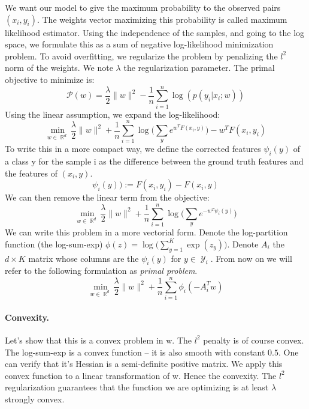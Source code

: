 \documentclass{article}
\DeclareMathOperator{\R}{\mathbb{R}}
\DeclareMathOperator{\1}{\mathbb{1}}
\DeclareMathOperator{\Y}{\mathcal{Y}}
\begin{document}
We want our model to give the maximum probability to the observed pairs $(x_i, y_i)$.
The weights vector maximizing this probability is called maximum likelihood estimator.
Using the independence of the samples, and going to the log space, we formulate this as a sum of negative log-likelihood minimization problem.
To avoid overfitting, we regularize the problem by penalizing the $l^2$ norm of the weights.
We note $\lambda$ the regularization parameter. The primal objective to minimize is:
\begin{equation*}
\mathscr P(w) = \frac{\lambda}{2}\|w\|^2 - \frac{1}{n}   \sum_{i=1}^{n} \log(p(y_i|x_i; w))	
\end{equation*}
Using the linear assumption, we expand the log-likelihood:
\begin{equation*}
	\min_{w\in\R^d} \frac{\lambda}{2}\|w\|^2 + \frac{1}{n}   \sum_{i=1}^{n}  \log \big (\sum_y e^{w^TF(x_i, y)} \big ) - w^TF(x_i, y_i)	
\end{equation*}
To write this in a more compact way, we define the corrected features $\psi_i(y)$ of a class y for the sample i as the difference between the ground truth features and the features of $(x_i, y)$.
\begin{equation*}
	\psi_i(y)) := F(x_i, y_i) - F(x_i, y)
\end{equation*}
We can then remove the linear term from the objective:
\begin{equation*}
	\min_{w\in\R^d} \frac{\lambda}{2}\|w\|^2 + \frac{1}{n}   \sum_{i=1}^{n}  \log \big (\sum_y e^{- w^T\psi_i(y)} \big )
\end{equation*}
We can write this problem in a more vectorial form.
Denote the log-partition function (the log-sum-exp) $\phi(z) = \log \big(\sum_{y=1}^K \exp(z_y)\big)$. 
Denote $A_i$ the $d \times K$ matrix whose columns are the $\psi_i(y)$ for $y \in \Y_i$.
From now on we will refer to the following formulation as \textit{primal problem}.
\begin{equation}
	\label{primal problem}
	\min_{w\in\R^d}  \frac{\lambda}{2}\|w\|^2 + \frac{1}{n}   \sum_{i=1}^{n} \phi_i(-A_i^Tw)
\end{equation} 

\paragraph{Convexity.}
Let's show that this is a convex problem in w.
The $l^2$ penalty is of course convex.
The log-sum-exp is a convex function -- it is also smooth with constant $0.5$.
One can verify that it's Hessian is a semi-definite positive matrix.
We apply this convex function to a linear transformation of w.
Hence the convexity.
The $l^2$ regularization guarantees that the function we are optimizing is at least $\lambda$ strongly convex. 
\end{document}

